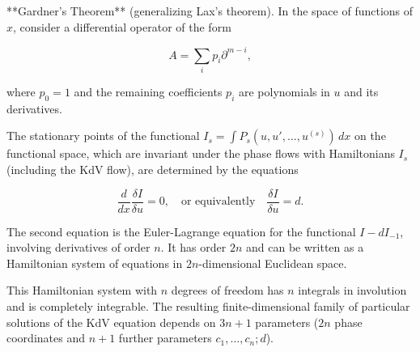 **Gardner's Theorem** (generalizing Lax's theorem). In the space of functions of $x$, consider a differential operator of the form

$$A = \sum_{i} p_i \partial^{m-i},$$

where $p_0 = 1$ and the remaining coefficients $p_i$ are polynomials in $u$ and its derivatives.

The stationary points of the functional $I_s = \int P_s(u, u', \ldots, u^{(s)}) \, dx$ on the functional space, which are invariant under the phase flows with Hamiltonians $I_s$ (including the KdV flow), are determined by the equations

$$\frac{d}{dx} \frac{\delta I}{\delta u} = 0, \quad \text{or equivalently} \quad \frac{\delta I}{\delta u} = d.$$

The second equation is the Euler-Lagrange equation for the functional $I - d I_{-1}$, involving derivatives of order $n$. It has order $2n$ and can be written as a Hamiltonian system of equations in $2n$-dimensional Euclidean space.

This Hamiltonian system with $n$ degrees of freedom has $n$ integrals in involution and is completely integrable. The resulting finite-dimensional family of particular solutions of the KdV equation depends on $3n+1$ parameters ($2n$ phase coordinates and $n+1$ further parameters $c_1, \ldots, c_n; d$).
